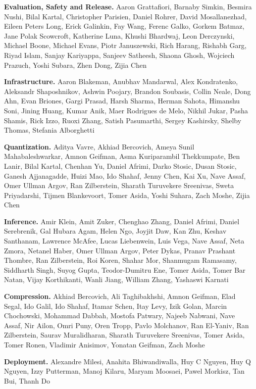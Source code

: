 \textbf{Evaluation, Safety and Release.} Aaron Grattafiori, Barnaby Simkin, Besmira Nushi, Bilal Kartal, Christopher Parisien, Daniel Rohrer, David Mosallanezhad, Eileen Peters Long, Erick Galinkin, Fay Wang, Ferenc Galko, Gorkem Batmaz, Jane Polak Scowcroft, Katherine Luna, Khushi Bhardwaj, Leon Derczynski, Michael Boone, Michael Evans, Piotr Januszewski, Rich Harang, Rishabh Garg, Riyad Islam, Sanjay Kariyappa, Sanjeev Satheesh, Shaona Ghosh, Wojciech Prazuch, Yoshi Subara, Zhen Dong, Zijia Chen

\textbf{Infrastructure.} Aaron Blakeman, Anubhav Mandarwal, Alex Kondratenko, Aleksandr Shaposhnikov, Ashwin Poojary, Brandon Soubasis, Collin Neale, Dong Ahn, Evan Briones, Gargi Prasad, Harsh Sharma, Herman Sahota, Himanshu Soni, Jining Huang, Kumar Anik, Maer Rodrigues de Melo, Nikhil Jukar, Pasha Shamis, Rick Izzo, Ruoxi Zhang, Satish Pasumarthi, Sergey Kashirsky, Shelby Thomas, Stefania Alborghetti

\textbf{Quantization.} Aditya Vavre, Akhiad Bercovich, Ameya Sunil Mahabaleshwarkar, Amnon Geifman, Asma Kuriparambil Thekkumpate, Ben Lanir, Bilal Kartal, Chenhan Yu, Daniel Afrimi, Darko Stosic, Dusan Stosic, Ganesh Ajjanagadde, Huizi Mao, Ido Shahaf, Jenny Chen, Kai Xu, Nave Assaf, Omer Ullman Argov, Ran Zilberstein, Sharath Turuvekere Sreenivas, Sweta Priyadarshi, Tijmen Blankevoort, Tomer Asida, Yoshi Suhara,  Zach Moshe, Zijia Chen

\textbf{Inference.} Amir Klein, Amit Zuker, Chenghao Zhang, Daniel Afrimi, Daniel Serebrenik, Gal Hubara Agam, Helen Ngo, Joyjit Daw, Kan Zhu, Keshav Santhanam, Lawrence McAfee, Lucas Liebenwein, Luis Vega, Nave Assaf, Neta Zmora, Netanel Haber, Omer Ullman Argov, Peter Dykas, Pranav Prashant Thombre, Ran Zilberstein, Roi Koren, Shahar Mor, Shanmugam Ramasamy, Siddharth Singh, Suyog Gupta, Teodor-Dumitru Ene, Tomer Asida, Tomer Bar Natan, Vijay Korthikanti, Wanli Jiang, William Zhang, Yashaswi Karnati

\textbf{Compression.} Akhiad Bercovich, Ali Taghibakhshi, Amnon Geifman, Elad Segal, Ido Galil, Ido Shahaf, Itamar Schen, Itay Levy, Izik Golan, Marcin Chochowski, Mohammad Dabbah, Mostofa Patwary, Najeeb Nabwani, Nave Assaf, Nir Ailon, Omri Puny, Oren Tropp, Pavlo Molchanov, Ran El-Yaniv, Ran Zilberstein, Saurav Muralidharan, Sharath Turuvekere Sreenivas, Tomer Asida, Tomer Ronen, Vladimir Anisimov, Yonatan Geifman, Zach Moshe

\textbf{Deployment.} Alexandre Milesi, Anahita Bhiwandiwalla, Huy C Nguyen, Huy Q Nguyen, Izzy Putterman, Manoj Kilaru, Maryam Moosaei, Pawel Morkisz, Tan Bui, Thanh Do


